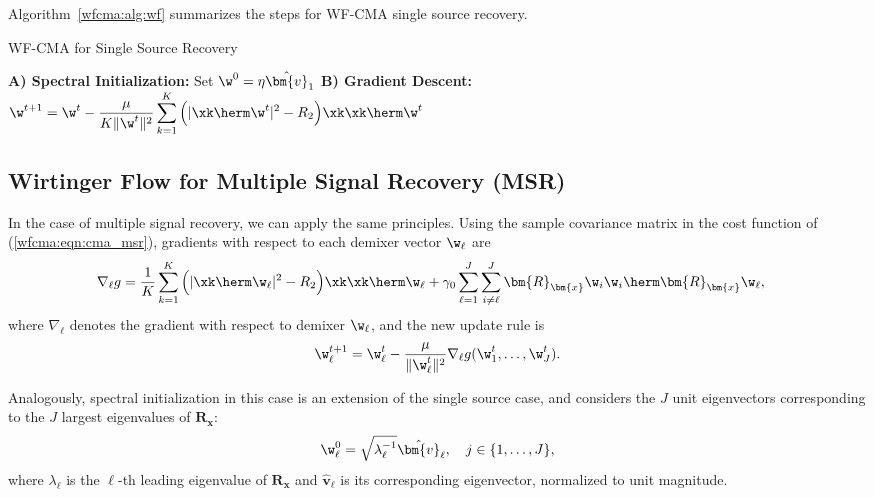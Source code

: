 Algorithm~\ref{wfcma:alg:wf} summarizes the steps
for WF-CMA single source recovery.
\begin{algorithm}[H]
\caption{WF-CMA for Single Source Recovery}
\label{wfcma:alg:wf}
\begin{algorithmic}[1]
	\Statex \textbf{A) Spectral Initialization:}
	\State Set $\w^0=\eta\hat{\bm{v}}_1$ 
	\Statex \textbf{B) Gradient Descent:}
	\State $\displaystyle \w^{t+1}=\w^t-\frac{\mu}{K\|\w^t\|^2}\sum_{k=1}^K\Big(|\xk\herm\w^t|^2-R_2\Big)\xk\xk\herm\w^t$
	\EndFor
\end{algorithmic}
\end{algorithm}

\subsection{Wirtinger Flow for Multiple Signal Recovery (MSR)}
In the case of multiple signal recovery, we can apply the same principles. Using the sample covariance matrix in the cost function of (\ref{wfcma:eqn:cma_msr}), gradients with respect to each demixer vector $\w_{\ell}$ are
\begin{align}
\nabla_{\ell}g&=\frac{1}{K}\sum_{k=1}^K\Big(|\xk\herm\w_{\ell}|^2-R_2\Big)\xk\xk\herm\w_{\ell}
+\gamma_0\sum_{\ell=1}^J\sum_{i\neq {\ell}}^J\bm{R}_{\bm{x}}\w_{i}\w_{i}\herm\bm{R}_{\bm{x}}\w_{\ell}, \label{wfcma:eqn:wfgradient_msr}
\end{align}
where $\nabla_{\ell}$ denotes the gradient with respect to demixer $\w_{\ell}$, and the new update rule is  
\begin{equation}
\w_{\ell}^{t+1}=\w_{\ell}^{t}-\frac{\mu}{\|\w_{\ell}^{t}\|^2}\nabla_{\ell}g(\w_{1}^{t},\ldots,\w_{J}^{t}). \label{wfcma:eqn:wfupdaterule_msr}
\end{equation}

Analogously, spectral initialization in this case is an extension of the single source case, and considers the $J$ unit eigenvectors corresponding to the $J$ largest eigenvalues of $\bm{R}_{\bm{x}}$:  
\begin{equation}
\w_{\ell}^{0} = \sqrt{\lambda_{\ell}^{-1}}\hat{\bm{v}}_{\ell},\quad j\in\{1,\ldots,J\},
\end{equation}
where $\lambda_{\ell}$ is the ${\ell}$-th leading eigenvalue of $\bm{R}_{\bm{x}}$ and $\hat{\bm{v}}_{\ell}$ is its corresponding eigenvector, normalized to unit magnitude. 

